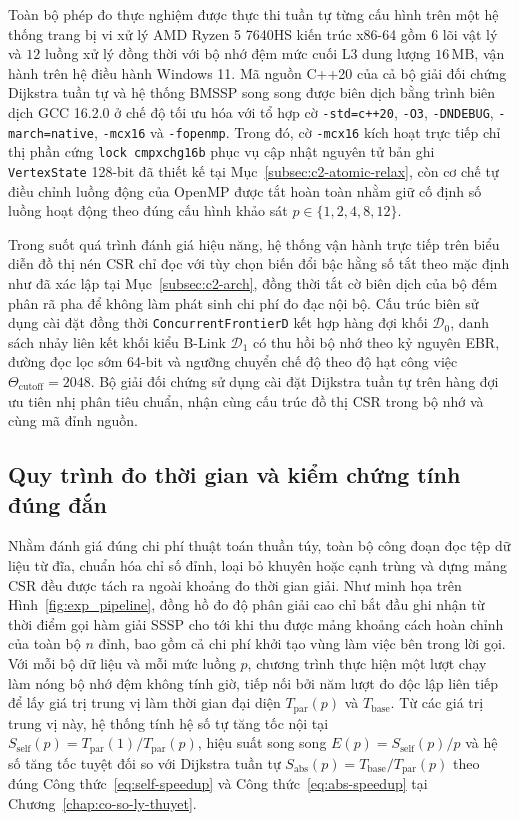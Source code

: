 Toàn bộ phép đo thực nghiệm được thực thi tuần tự từng cấu hình trên một hệ thống trang bị vi xử lý AMD Ryzen 5 7640HS kiến trúc x86-64 gồm $6$ lõi vật lý và $12$ luồng xử lý đồng thời với bộ nhớ đệm mức cuối L3 dung lượng $16\,\mathrm{MB}$, vận hành trên hệ điều hành Windows 11. Mã nguồn C++20 của cả bộ giải đối chứng Dijkstra tuần tự và hệ thống BMSSP song song được biên dịch bằng trình biên dịch GCC 16.2.0 ở chế độ tối ưu hóa với tổ hợp cờ \texttt{-std=c++20}, \texttt{-O3}, \texttt{-DNDEBUG}, \texttt{-march=native}, \texttt{-mcx16} và \texttt{-fopenmp}. Trong đó, cờ \texttt{-mcx16} kích hoạt trực tiếp chỉ thị phần cứng \texttt{lock cmpxchg16b} phục vụ cập nhật nguyên tử bản ghi \texttt{VertexState} 128-bit đã thiết kế tại Mục~\ref{subsec:c2-atomic-relax}, còn cơ chế tự điều chỉnh luồng động của OpenMP được tắt hoàn toàn nhằm giữ cố định số luồng hoạt động theo đúng cấu hình khảo sát $p \in \{1, 2, 4, 8, 12\}$.

Trong suốt quá trình đánh giá hiệu năng, hệ thống vận hành trực tiếp trên biểu diễn đồ thị nén CSR chỉ đọc với tùy chọn biến đổi bậc hằng số tắt theo mặc định như đã xác lập tại Mục~\ref{subsec:c2-arch}, đồng thời tắt cờ biên dịch của bộ đếm phân rã pha để không làm phát sinh chi phí đo đạc nội bộ. Cấu trúc biên sử dụng cài đặt đồng thời \texttt{Concurrent\allowbreak FrontierD} kết hợp hàng đợi khối $\mathcal{D}_0$, danh sách nhảy liên kết khối kiểu B-Link $\mathcal{D}_1$ có thu hồi bộ nhớ theo kỷ nguyên EBR, đường đọc lọc sớm 64-bit và ngưỡng chuyển chế độ theo độ hạt công việc $\Theta_{\mathrm{cutoff}} = 2048$. Bộ giải đối chứng sử dụng cài đặt Dijkstra tuần tự trên hàng đợi ưu tiên nhị phân tiêu chuẩn, nhận cùng cấu trúc đồ thị CSR trong bộ nhớ và cùng mã đỉnh nguồn.

\subsection{Quy trình đo thời gian và kiểm chứng tính đúng đắn}\label{subsec:c3-phuong-phap}

Nhằm đánh giá đúng chi phí thuật toán thuần túy, toàn bộ công đoạn đọc tệp dữ liệu từ đĩa, chuẩn hóa chỉ số đỉnh, loại bỏ khuyên hoặc cạnh trùng và dựng mảng CSR đều được tách ra ngoài khoảng đo thời gian giải. Như minh họa trên Hình~\ref{fig:exp_pipeline}, đồng hồ đo độ phân giải cao chỉ bắt đầu ghi nhận từ thời điểm gọi hàm giải SSSP cho tới khi thu được mảng khoảng cách hoàn chỉnh của toàn bộ $n$ đỉnh, bao gồm cả chi phí khởi tạo vùng làm việc bên trong lời gọi. Với mỗi bộ dữ liệu và mỗi mức luồng $p$, chương trình thực hiện một lượt chạy làm nóng bộ nhớ đệm không tính giờ, tiếp nối bởi năm lượt đo độc lập liên tiếp để lấy giá trị trung vị làm thời gian đại diện $T_{\mathrm{par}}(p)$ và $T_{\mathrm{base}}$. Từ các giá trị trung vị này, hệ thống tính hệ số tự tăng tốc nội tại $S_{\mathrm{self}}(p) = T_{\mathrm{par}}(1) / T_{\mathrm{par}}(p)$, hiệu suất song song $E(p) = S_{\mathrm{self}}(p) / p$ và hệ số tăng tốc tuyệt đối so với Dijkstra tuần tự $S_{\mathrm{abs}}(p) = T_{\mathrm{base}} / T_{\mathrm{par}}(p)$ theo đúng Công thức~\eqref{eq:self-speedup} và Công thức~\eqref{eq:abs-speedup} tại Chương~\ref{chap:co-so-ly-thuyet}.

